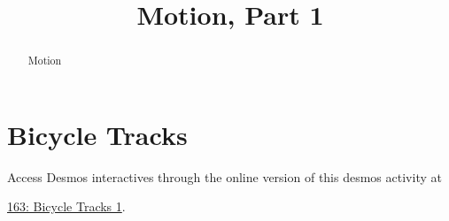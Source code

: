 \documentclass{ximera}
\title{Motion, Part 1}
\begin{document}
\begin{abstract}
Motion
\end{abstract}
\maketitle


\begin{exploration}
 
\begin{onlineOnly}
    \begin{center}
\end{center}
\end{onlineOnly}
\end{exploration}


\begin{exploration}
 
\begin{onlineOnly}
    \begin{center}
\end{center}
\end{onlineOnly}
\end{exploration}



\section{Bicycle Tracks}


\begin{exploration}

 
\begin{onlineOnly}
    \begin{center}
\end{center}
\end{onlineOnly}


Access Desmos interactives through the online version of this desmos activity at
 
\href{https://www.desmos.com/calculator/kgbegnskjr}{163: Bicycle Tracks 1}.


\end{exploration}
\end{document}
